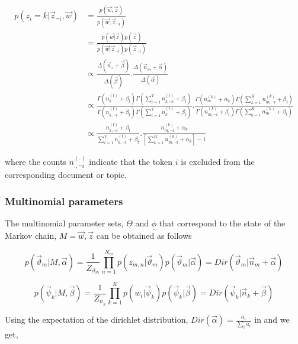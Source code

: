 \begin{align}
p(z_i=k|\vec{z}_{\neg i},\vec{w})	& = \frac{p(\vec{w},\vec{z})}{p(\vec{w},\vec{z}_{\neg i})} \\
					& = \frac{p(\vec{w}|\vec{z})p(\vec{z})}{p(\vec{w}|\vec{z}_{\neg i})p(\vec{z}_{\neg i})} \\
					& \propto \frac{\Delta(\vec{n}_z+\vec{\beta})}{\Delta(\vec{\beta})} . \frac{\Delta(\vec{n}_m+\vec{\alpha})}{\Delta(\vec{\alpha})} \\
					& \propto \frac{\Gamma(n_{k}^{(t)} + \beta_t)\Gamma(\sum_{t=1}^{V} n_{k,\neg i}^{(t)} + \beta_t)}{\Gamma(n_{k,\neg i}^{(t)} + \beta_t)\Gamma(\sum_{t=1}^{V} n_{k}^{(t)} + \beta_t)}.
						  \frac{\Gamma(n_{m}^{(k)} + \alpha_k)\Gamma(\sum_{k=1}^{K} n_{m,\neg i}^{(k)} + \beta_t)}{\Gamma(n_{m,\neg i}^{(k)} + \beta_t)\Gamma(\sum_{k=1}^{K} n_{m}^{(k)} + \beta_t)} \\
					& \propto \frac{n_{k,\neg i}^{(t)} + \beta_t}{\sum_{t=1}^{V}n_{k,\neg i}^{(t)} + \beta_t}.
						  \frac{n_{m,\neg i}^{(k)} + \alpha_k}{[\sum_{k=1}^{K}n_{m,\neg i}^{(k)} + \alpha_k]-1}
					\label{eqn:fullconditionalfinal}
\end{align}

where the counts \(n_{.,\neg i}^{(.)}\) indicate that the token \(i\) is excluded from the corresponding document or topic.

\subsubsection*{Multinomial parameters}

The multinomial parameter sets, \(\underline{\Theta}\) and \(\underline{\phi}\) that correspond to the state of the Markov
chain, \(M={\vec{w},\vec{z}}\) can be obtained as follows

\begin{equation}\label{eqn:multtheta}
p(\vec{\vartheta}_m|M,\vec{\alpha}) = \frac{1}{Z_{\vartheta_m}} \prod_{n=1}^{N_m} p(z_{m,n}|\vec{\vartheta}_m) p(\vec{\vartheta}_m|\vec{\alpha}) = 	Dir(\vec{\vartheta}_m|\vec{n}_m + \vec{\alpha})
\end{equation}

\begin{equation}\label{eqn:multphi}
p(\vec{\psi}_k|M,\vec{\beta}) = \frac{1}{Z_{\psi_k}} \prod_{k=1}^{K} p(w_{i}|\vec{\psi}_k) p(\vec{\psi}_k|\vec{\beta}) = 	Dir(\vec{\psi}_k|\vec{n}_k + \vec{\beta}) 
\end{equation}

Using the expectation of the dirichlet distribution, \(Dir(\vec{\alpha}) = \frac{a_i}{\sum_i a_i}\) in  and  we get,

